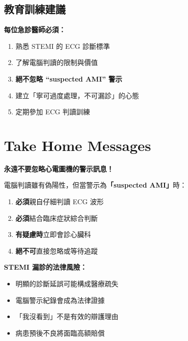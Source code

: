 \documentclass[12pt,a4paper]{article}
\begin{document}
\subsection{教育訓練建議}

\begin{learningbox}
\textbf{每位急診醫師必須：}
\begin{enumerate}[noitemsep]
\item 熟悉 STEMI 的 ECG 診斷標準
\item 了解電腦判讀的限制與價值
\item \textbf{絕不忽略 ``suspected AMI'' 警示}
\item 建立「寧可過度處理，不可漏診」的心態
\item 定期參加 ECG 判讀訓練
\end{enumerate}
\end{learningbox}

\newpage
\section{Take Home Messages}

\begin{alertbox}
\textbf{永遠不要忽略心電圖機的警示訊息！}

電腦判讀雖有偽陽性，但當警示為\textbf{「suspected AMI」}時：
\begin{enumerate}[noitemsep]
\item \textbf{必須}親自仔細判讀 ECG 波形
\item \textbf{必須}結合臨床症狀綜合判斷
\item \textbf{有疑慮時}立即會診心臟科
\item \textbf{絕不可}直接忽略或等待追蹤
\end{enumerate}
\end{alertbox}

\vspace{1cm}

\begin{keypoint}
\textbf{STEMI 漏診的法律風險：}
\begin{itemize}[noitemsep]
\item 明顯的診斷延誤可能構成醫療疏失
\item 電腦警示紀錄會成為法律證據
\item 「我沒看到」不是有效的辯護理由
\item 病患預後不良將面臨高額賠償
\end{itemize}
\end{keypoint}
\end{document}
